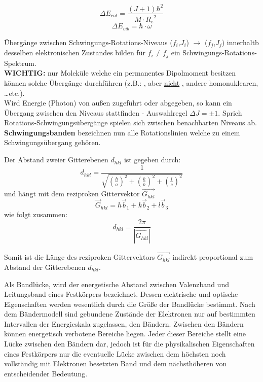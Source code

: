 \[\Delta E_{rot} = \frac{(J+1)\hbar^2}{M\cdot {R_e}^2}\]  %
\[\Delta E_{vib} = \hbar \cdot \omega\]

\label{q:3}

Übergänge zwischen Schwingungs-Rotations-Niveaus ($f_i$,$J_i$) $\rightarrow$ ($f_j$,$J_j$) innerhaltb desselben elektronischen Zustandes bilden für $f_i \neq f_j$ ein Schwingungs-Rotations-Spektrum. \\

\textbf{WICHTIG:} nur Moleküle welche ein permanentes Dipolmoment besitzen können solche Übergänge durchführen (z.B.: ,  aber \underline{nicht} , andere homonuklearen, \dots etc.). \\

Wird Energie (Photon) von außen zugeführt oder abgegeben, so kann ein Übergang zwischen den Niveaus stattfinden - Auswahlregel $\Delta J = \pm 1$. Sprich Rotations-Schwingungsübergänge spielen sich zwischen benachbarten Niveaus ab.\\

\textbf{Schwingungsbanden} bezeichnen nun alle Rotationslinien welche zu einem Schwingungsübergang gehören. \\


\label{q:4}

Der Abstand zweier Gitterebenen $d_{hkl}$ ist gegeben durch:
\[d_{hkl} = \frac{1}{\sqrt{\left(\frac{h}{a}\right)^2 + \left(\frac{k}{b}\right)^2 + \left(\frac{l}{c}\right)^2}}\]
und hängt mit dem reziproken Gittervektor $\vec{G_{hkl}}$ 
\[\vec{G}_{hkl} = h\vec{b}_1 + k\vec{b}_2 + l\vec{b}_3\]
wie folgt zusammen:
\[d_{hkl} = \frac{2\pi}{|\vec{G_{hkl}}|}\]

Somit ist die Länge des reziproken Gittervektors $\vec{G_{hkl}}$ indirekt proportional zum Abstand der Gitterebenen $d_{hkl}$.

\label{q:5}

Als Bandlücke, wird der energetische Abstand zwischen Valenzband und Leitungsband eines Festkörpers bezeichnet. Dessen elektrische und optische Eigenschaften werden wesentlich durch die Größe der Bandlücke bestimmt.
Nach dem Bändermodell sind gebundene Zustände der Elektronen nur auf bestimmten Intervallen der Energieskala zugelassen, den Bändern. Zwischen den Bändern können energetisch verbotene Bereiche liegen. Jeder dieser Bereiche stellt eine Lücke zwischen den Bändern dar, jedoch ist für die physikalischen Eigenschaften eines Festkörpers nur die eventuelle Lücke zwischen dem höchsten noch vollständig mit Elektronen besetzten Band und dem nächsthöheren von entscheidender Bedeutung.


